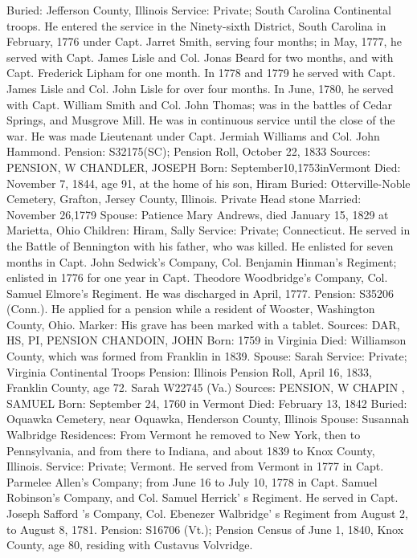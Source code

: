 Buried: Jefferson County, Illinois 
Service: Private; South Carolina Continental troops. He entered the service in the Ninety-sixth District, South Carolina in February, 1776 under Capt. Jarret Smith, serving four months; in May, 1777, he served with Capt. James Lisle and Col. Jonas Beard for two months, and with Capt. Frederick Lipham for one month. In 1778 and 1779 he served with Capt. James Lisle and Col. John Lisle for over four months. In June, 1780, he served with Capt. William Smith and Col. John Thomas; was in the battles of Cedar Springs, and Musgrove Mill. He was in continuous service until the close of the war. He was made Lieutenant under Capt. Jermiah Williams and Col. John Hammond. 
Pension: S32175(SC); Pension Roll, October 22, 1833 
Sources: PENSION, W 
CHANDLER, JOSEPH 
Born: September10,1753inVermont  
Died: November 7, 1844, age 91, at the home of his son, Hiram 
Buried: Otterville-Noble Cemetery, Grafton, Jersey County, Illinois. Private Head­ stone 
Married: November 26,1779 
Spouse: Patience Mary Andrews, died January 15, 1829 at Marietta, Ohio 
Children: Hiram, Sally 
Service: Private; Connecticut. He served in the Battle of Bennington with his father, who was killed. He enlisted for seven months in Capt. John Sedwick's Company, Col. Benjamin Hinman's Regiment; enlisted in 1776 for one year in Capt. Theodore Woodbridge's Company, Col. Samuel Elmore's Regiment. He was discharged in April, 1777. 
Pension: S35206 (Conn.). He applied for a pension while a resident of Wooster, Washington County, Ohio. 
Marker: His grave has been marked with a tablet. 
Sources: DAR, HS, PI, PENSION 
CHANDOIN, JOHN 
Born: 1759 in Virginia 
Died: Williamson County, which was formed from Franklin in 1839. 
Spouse: Sarah 
Service: Private; Virginia Continental Troops 
Pension: Illinois Pension Roll, April 16, 1833, Franklin County, age 72. Sarah W22745 (Va.) 
Sources: PENSION, W 
CHAPIN , SAMUEL 
Born: September 24, 1760 in Vermont 
Died: February 13, 1842 
Buried: Oquawka Cemetery, near Oquawka, Henderson County, Illinois 
Spouse: Susannah Walbridge 
Residences: From Vermont he removed to New York, then to Pennsylvania, and from there to Indiana, and about 1839 to Knox County, Illinois. 
Service: Private; Vermont. He served from Vermont in 1777 in Capt. Parmelee Allen's Company; from June 16 to July 10, 1778 in Capt. Samuel Robinson's Company, and Col. Samuel Herrick' s Regiment. He served in Capt. Joseph Safford 's Company, Col. Ebenezer Walbridge' s Regiment from August 2, to August 8, 1781. 
Pension: S16706 (Vt.); Pension Census of June 1, 1840, Knox County, age 80, residing with Custavus Volvridge. 
